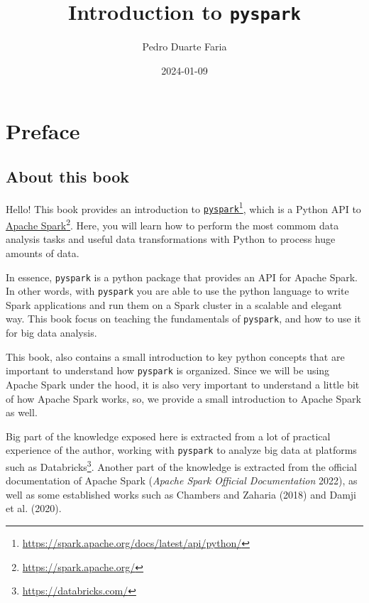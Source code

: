 \documentclass[
  11pt,
  letterpaper,
  DIV=11,
  numbers=noendperiod]{scrreprt}
\title{Introduction to \texttt{pyspark}}
\author{Pedro Duarte Faria}
\date{2024-01-09}
\renewcommand*\contentsname{Table of contents}
\newcommand\contentsname{Table of contents}
\begin{document}
\maketitle

\renewcommand*\contentsname{Table of contents}
{
\hypersetup{linkcolor=}
\setcounter{tocdepth}{2}
\tableofcontents
}

\chapter*{Preface}\label{preface}


\section*{About this book}\label{about-this-book}


Hello! This book provides an introduction to
\href{https://spark.apache.org/docs/latest/api/python/}{\texttt{pyspark}}\footnote{\url{https://spark.apache.org/docs/latest/api/python/}},
which is a Python API to \href{https://spark.apache.org/}{Apache
Spark}\footnote{\url{https://spark.apache.org/}}. Here, you will learn
how to perform the most commom data analysis tasks and useful data
transformations with Python to process huge amounts of data.

In essence, \texttt{pyspark} is a python package that provides an API
for Apache Spark. In other words, with \texttt{pyspark} you are able to
use the python language to write Spark applications and run them on a
Spark cluster in a scalable and elegant way. This book focus on teaching
the fundamentals of \texttt{pyspark}, and how to use it for big data
analysis.

This book, also contains a small introduction to key python concepts
that are important to understand how \texttt{pyspark} is organized.
Since we will be using Apache Spark under the hood, it is also very
important to understand a little bit of how Apache Spark works, so, we
provide a small introduction to Apache Spark as well.

Big part of the knowledge exposed here is extracted from a lot of
practical experience of the author, working with \texttt{pyspark} to
analyze big data at platforms such as Databricks\footnote{\url{https://databricks.com/}}.
Another part of the knowledge is extracted from the official
documentation of Apache Spark (\emph{Apache Spark Official
Documentation} 2022), as well as some established works such as Chambers
and Zaharia (2018) and Damji et al. (2020).
\end{document}
